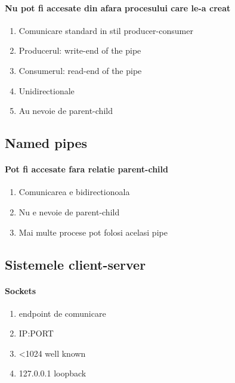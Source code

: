 \documentclass{article}
\begin{document}
\paragraph*{Nu pot fi accesate din afara procesului care le-a creat}
\begin{enumerate}
    \item Comunicare standard in stil producer-consumer
    \item Producerul: write-end of the pipe
    \item Consumerul: read-end of the pipe
    \item Unidirectionale
    \item Au nevoie de parent-child
\end{enumerate}

\subsection*{Named pipes}
\paragraph*{Pot fi accesate fara relatie parent-child}
\begin{enumerate}
    \item Comunicarea e bidirectionoala
    \item Nu e nevoie de parent-child
    \item Mai multe procese pot folosi acelasi pipe
\end{enumerate}

\subsection*{Sistemele client-server}
\paragraph*{Sockets}
\begin{enumerate}
    \item endpoint de comunicare
    \item IP:PORT
    \item <1024 well known
    \item 127.0.0.1 loopback
\end{enumerate}
\end{document}
